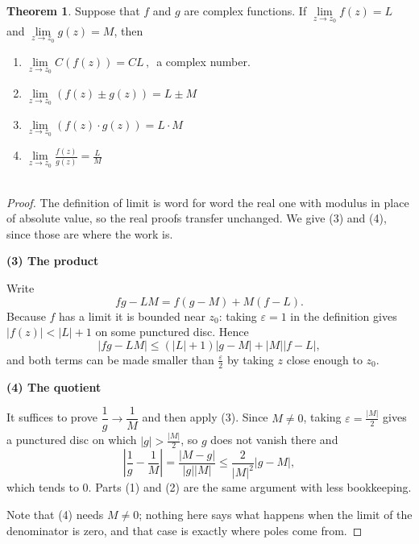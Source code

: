 \documentclass[11pt,a4paper]{article}
\theoremstyle{definition}
\newtheorem{thm}{Theorem}[section]
\newcommand{\subhead}[1]{%
  \par\medskip\noindent\textbf{#1}\par\nobreak\smallskip}
\begin{document}
\begin{thm}
Suppose that $f$ and $g$ are complex functions. If $\lim\limits_{z\rightarrow z_0} f(z) = L$ and $\lim\limits_{z\rightarrow z_0} g(z) = M$, then
\begin{enumerate}
\item $\displaystyle{\lim\limits_{z\rightarrow z_0}C( f(z)) = CL}\,,\,$ a complex number.
\item $\displaystyle{\lim\limits_{z\rightarrow z_0} (f(z)\pm g(z)) = L\pm M}$
\item $\displaystyle{\lim\limits_{z\rightarrow z_0} (f(z)\cdot g(z) )= L\cdot M}$
\item $\displaystyle{\lim\limits_{z\rightarrow z_0} \frac{f(z)}{g(z)} = \frac{L}{M}}$\\\\
\end{enumerate}

\begin{proof}
The definition of limit is word for word the real one with modulus in place of
absolute value, so the real proofs transfer unchanged. We give (3) and (4),
since those are where the work is.

\subhead{(3) The product}
Write
$$f g-LM=f(g-M)+M(f-L).$$
Because $f$ has a limit it is bounded near $z_0$: taking $\varepsilon=1$ in the
definition gives $\left|f(z)\right|<\left|L\right|+1$ on some punctured disc.
Hence
$$\left|fg-LM\right|\leq\left(\left|L\right|+1\right)\left|g-M\right|
+\left|M\right|\left|f-L\right| ,$$
and both terms can be made smaller than $\frac{\varepsilon}{2}$ by taking $z$
close enough to $z_0$.

\subhead{(4) The quotient}
It suffices to prove $\dfrac{1}{g}\rightarrow\dfrac{1}{M}$ and then apply (3).
Since $M\neq 0$, taking $\varepsilon=\frac{\left|M\right|}{2}$ gives a
punctured disc on which $\left|g\right|>\frac{\left|M\right|}{2}$, so $g$ does
not vanish there and
$$\left|\frac{1}{g}-\frac{1}{M}\right|=\frac{\left|M-g\right|}
{\left|g\right|\left|M\right|}\leq\frac{2}{\left|M\right|^{2}}\left|g-M\right|,$$
which tends to $0$. Parts (1) and (2) are the same argument with less
bookkeeping.

Note that (4) needs $M\neq 0$; nothing here says what happens when the limit of
the denominator is zero, and that case is exactly where poles come from.
\end{proof}
\end{thm}
\end{document}
